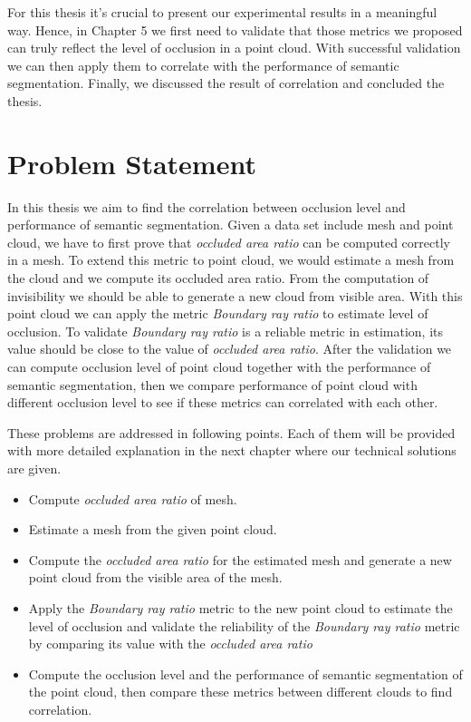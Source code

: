 \documentclass[11pt, a4paper,oneside,chapterprefix=false]{scrbook}
\begin{document}
\vspace{10pt}

For this thesis it's crucial to present our experimental results in a meaningful way. Hence, in Chapter 5 we first need to validate that those metrics we proposed can truly reflect the level of occlusion in a point cloud. With successful validation we can then apply them to correlate with the performance of semantic segmentation. Finally, we discussed the result of correlation and concluded the thesis.


\chapter{Problem Statement} \label{chp:problem}

In this thesis we aim to find the correlation between occlusion level and performance of semantic segmentation. Given a data set include mesh and point cloud, we have to first prove that \textit{occluded area ratio} can be computed correctly in a mesh. To extend this metric to point cloud, we would estimate a mesh from the cloud and we compute its occluded area ratio. From the computation of invisibility we should be able to generate a new cloud from visible area. With this point cloud we can apply the metric \textit{Boundary ray ratio} to estimate level of occlusion. To validate \textit{Boundary ray ratio} is a reliable metric in estimation, its value should be close to the value of \textit{occluded area ratio}. After the validation we can compute occlusion level of point cloud together with the performance of semantic segmentation, then we compare performance of point cloud with different occlusion level to see if these metrics can correlated with each other.

\vspace{10pt}

These problems are addressed in following points. Each of them will be provided with more detailed explanation in the next chapter where our technical solutions are given.

\begin{itemize}
    \item Compute \textit{occluded area ratio} of mesh.
    \item Estimate a mesh from the given point cloud.
    \item Compute the \textit{occluded area ratio} for the estimated mesh and generate a new point cloud from the visible area of the mesh.
    \item Apply the \textit{Boundary ray ratio} metric to the new point cloud to estimate the level of occlusion and validate the reliability of the \textit{Boundary ray ratio} metric by comparing its value with the \textit{occluded area ratio}
    \item Compute the occlusion level and the performance of semantic segmentation of the point cloud, then compare these metrics between different clouds to find correlation. 
\end{itemize}
\end{document}
